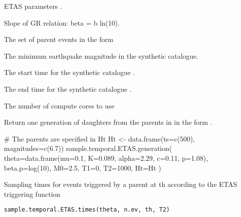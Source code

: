 \documentclass[letterpaper]{book}
\begin{document}
%
\begin{Arguments}
\begin{ldescription}
\item[\code{theta}] ETAS parameters .

\item[\code{beta.p}] Slope of GR relation: beta = b ln(10).

\item[\code{Ht}] The set of parent events in the form 

\item[\code{M0}] The minimum earthquake magnitude in the synthetic catalogue.

\item[\code{T1}] The start time for the synthetic catalogue .

\item[\code{T2}] The end time for the synthetic catalogue .

\item[\code{ncore}] The number of compute cores to use
\end{ldescription}
\end{Arguments}
%
\begin{Value}
Return one generation of daughters from the parents in  in the form .
\end{Value}
%
\begin{Examples}
\begin{ExampleCode}
# The parents are specified in Ht
Ht <- data.frame(ts=c(500), magnitudes=c(6.7))
sample.temporal.ETAS.generation( theta=data.frame(mu=0.1, K=0.089, alpha=2.29, c=0.11, p=1.08), beta.p=log(10), M0=2.5, T1=0, T2=1000, Ht=Ht )
\end{ExampleCode}
\end{Examples}
%
\begin{Description}\relax
Sampling times for events triggered by a parent at th according to the ETAS triggering function
\end{Description}
%
\begin{Usage}
\begin{verbatim}
sample.temporal.ETAS.times(theta, n.ev, th, T2)
\end{verbatim}
\end{Usage}
\end{document}
